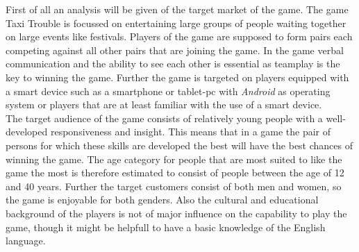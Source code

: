 First of all an analysis will be given of the target market of the game. The game Taxi Trouble is focussed on entertaining large groups of people waiting together on large events like festivals. Players of the game are supposed to form pairs each competing against all other pairs that are joining the game. In the game verbal communication and the ability to see each other is essential as teamplay is the key to winning the game. Further the game is targeted on players equipped with a smart device such as a smartphone or tablet-pc with \textit{Android} as operating system or players that are at least familiar with the use of a smart device.\\
The target audience of the game consists of relatively young people with a well-developed responsiveness and insight. This means that in a game the pair of persons for which these skills are developed the best will have the best chances of winning the game. The age category for people that are most suited to like the game the most is therefore estimated to consist of people between the age of 12 and 40 years. Further the target customers consist of both men and women, so the game is enjoyable for both genders. Also the cultural and educational background of the players is not of major influence on the capability to play the game, though it might be helpfull to have a basic knowledge of the English language.
     